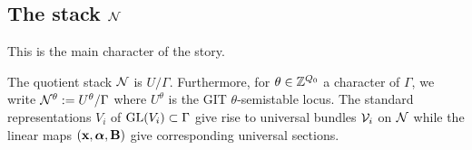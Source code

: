 \documentclass{amsart}
\newcommand{\balpha}{\boldsymbol{\alpha}}
\theoremstyle{definition}
\begin{document}





\subsection{The stack $\mathcal{N}$}
This is the main character of the story.

\begin{definition}
The quotient stack $\mathcal{N}$ is $U/\Gamma$.
Furthermore, for $\theta \in \mathbb{Z}^{Q_0}$ a character of $\Gamma$, we write $\mathcal{N}^\theta:= U^\theta/\Gamma$ where $U^\theta$ is the GIT $\theta$-semistable locus.
The standard representations $V_i$ of $\operatorname{GL}(V_i) \subset \Gamma$ give rise to universal bundles $\mathcal{V}_i$ on $\mathcal{N}$ while the linear maps $(\bfx, \balpha, \bfB)$ give corresponding universal sections.
\end{definition}
\end{document}
